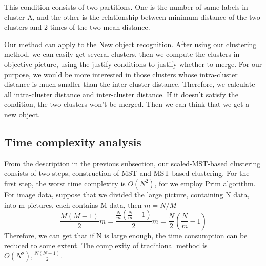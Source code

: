 		This condition consists of two partitions. One is the number of same labels in cluster A, and the other is the relationship between minimum distance of the two clusters and 2 times of the two mean distance.      

		Our method can apply to the New object recognition. After using our clustering method, we can easily get several clusters, then we compute the clusters in objective picture, using the justify conditions to justify whether to merge. For our purpose, we would be more interested in those clusters whose intra-cluster distance is much smaller than the inter-cluster distance. Therefore, we calculate all intra-cluster distance and inter-cluster distance. If it doesn't satisfy the condition, the two clusters won't be merged. Then we can think that we get a new object.  
	\subsection{Time complexity analysis}
		From the description in the previous subsection, our scaled-MST-based clustering consists of two steps, construction of MST and MST-based clustering. For the first step, the worst time complexity is $O(N^2)$, for we employ Prim algorithm. For image data, suppose that we divided the large picture, containing N data, into m pictures, each contains M data, then $m = N/M$ $$\frac{M(M-1)}{2}m = \frac{\frac{N}{m}(\frac{N}{m}-1)}{2}m = \frac{N}{2}(\frac{N}{m}-1)$$ Therefore, we can get that if N is large enough, the time consumption can be reduced to some extent. The complexity of traditional method is  $O(N^2), \frac{N(N-1)}{2}$.  
